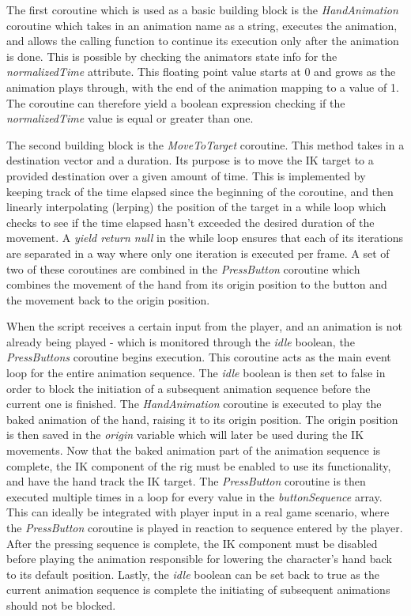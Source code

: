 The first coroutine which is used as a basic building block is the
\textit{HandAnimation} coroutine which takes in an animation name as a string,
executes the animation, and allows the calling function to continue its
execution only after the animation is done. This is possible by checking the
animators state info for the \textit{normalizedTime} attribute. This floating
point value starts at 0 and grows as the animation plays through, with the end
of the animation mapping to a value of 1. The coroutine can therefore yield
a boolean expression checking if the \textit{normalizedTime} value is equal or
greater than one. 

The second building block is the \textit{MoveToTarget} coroutine. This method
takes in a destination vector and a duration. Its purpose is to move the IK
target to a provided destination over a given amount of time. This is
implemented by keeping track of the time elapsed since the beginning of the
coroutine, and then linearly interpolating (lerping) the position of the target
in a while loop which checks to see if the time elapsed hasn't exceeded the
desired duration of the movement. A \textit{yield return null} in the while loop
ensures that each of its iterations are separated in a way where only one
iteration is executed per frame. A set of two of these coroutines are combined
in the \textit{PressButton} coroutine which combines the movement of the hand
from its origin position to the button and the movement back to the origin
position.

When the script receives a certain input from the player, and an animation is
not already being played - which is monitored through the \textit{idle} boolean,
the \textit{PressButtons} coroutine begins execution. This coroutine acts as the
main event loop for the entire animation sequence. The \textit{idle} boolean is
then set to false in order to block the initiation of a subsequent animation
sequence before the current one is finished. The \textit{HandAnimation}
coroutine is executed to play the baked animation of the hand, raising it to its
origin position. The origin position is then saved in the \textit{origin}
variable which will later be used during the IK movements. Now that the baked
animation part of the animation sequence is complete, the IK component of the
rig must be enabled to use its functionality, and have the hand track the IK
target. The \textit{PressButton} coroutine is then executed multiple times in
a loop for every value in the \textit{buttonSequence} array. This can ideally be
integrated with player input in a real game scenario, where the
\textit{PressButton} coroutine is played in reaction to sequence entered by the
player. After the pressing sequence is complete, the IK component must be
disabled before playing the animation responsible for lowering the character's
hand back to its default position. Lastly, the \textit{idle} boolean can be set
back to true as the current animation sequence is complete the initiating of
subsequent animations should not be blocked.

